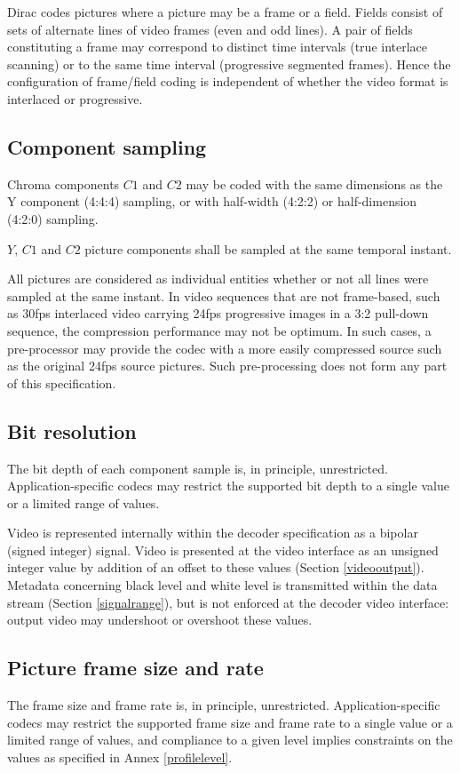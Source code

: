 Dirac codes pictures where a picture may be a frame or a field. Fields consist 
of sets of alternate lines of video frames (even and odd lines). A pair of 
fields constituting a frame may correspond to distinct time intervals (true
interlace scanning) or to the same time interval (progressive segmented frames).
 Hence the configuration of frame/field coding is independent of whether the 
video format is interlaced or progressive.

\subsection{Component sampling}

Chroma components $C1$ and $C2$ may be coded with the same dimensions as the Y
 component (4:4:4) sampling, or with half-width (4:2:2) or half-dimension 
(4:2:0) sampling.

$Y$, $C1$ and $C2$ picture components shall be sampled at the same temporal
instant.

\begin{informative}
All pictures are considered as individual entities whether or not all lines were
 sampled at the same instant. In video sequences that are not frame-based, such 
as 30fps interlaced video carrying 24fps progressive images in a 3:2 
pull-down sequence, the compression performance may not be optimum. In such 
cases, a pre-processor may provide the codec with a more easily compressed 
source such as the original 24fps source pictures. Such pre-processing does not form any part of this specification.
\end{informative}

\subsection{Bit resolution}

The bit depth of each component sample is, in principle, unrestricted. 
Application-specific codecs may restrict the supported bit depth to a single 
value or a limited range of values.

Video is represented internally within the decoder specification as a bipolar
 (signed integer) signal. Video is presented at the video interface as an 
unsigned integer value by addition of an offset to these values 
(Section \ref{videooutput}). Metadata concerning black level and white level 
is transmitted
 within the data stream (Section \ref{signalrange}), but is not enforced at the
decoder video interface: output video may undershoot or overshoot these values.

\subsection{Picture frame size and rate}

The frame size and frame rate is, in principle, unrestricted. 
Application-specific codecs may restrict the supported frame size and frame rate
 to a single value or a limited range of values, and compliance to a given level
 implies constraints on the values as specified in Annex \ref{profilelevel}.

